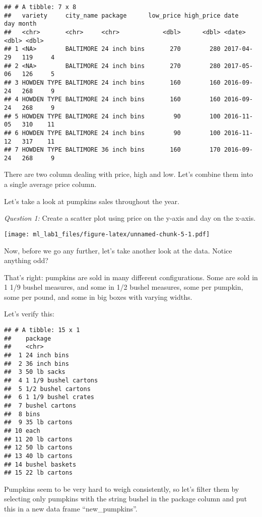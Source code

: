 \documentclass[
]{article}
\begin{document}
\begin{verbatim}
## # A tibble: 7 x 8
##   variety     city_name package      low_price high_price date         day month
##   <chr>       <chr>     <chr>            <dbl>      <dbl> <date>     <dbl> <dbl>
## 1 <NA>        BALTIMORE 24 inch bins       270        280 2017-04-29   119     4
## 2 <NA>        BALTIMORE 24 inch bins       270        280 2017-05-06   126     5
## 3 HOWDEN TYPE BALTIMORE 24 inch bins       160        160 2016-09-24   268     9
## 4 HOWDEN TYPE BALTIMORE 24 inch bins       160        160 2016-09-24   268     9
## 5 HOWDEN TYPE BALTIMORE 24 inch bins        90        100 2016-11-05   310    11
## 6 HOWDEN TYPE BALTIMORE 24 inch bins        90        100 2016-11-12   317    11
## 7 HOWDEN TYPE BALTIMORE 36 inch bins       160        170 2016-09-24   268     9
\end{verbatim}

There are two column dealing with price, high and low. Let's combine
them into a single average price column.

Let's take a look at pumpkins sales throughout the year.

\emph{Question 1:} Create a scatter plot using price on the y-axis and
day on the x-axis.

\texttt{[image: ml\_lab1\_files/figure-latex/unnamed-chunk-5-1.pdf]}

Now, before we go any further, let's take another look at the data.
Notice anything odd?

That's right: pumpkins are sold in many different configurations. Some
are sold in 1 1/9 bushel measures, and some in 1/2 bushel measures, some
per pumpkin, some per pound, and some in big boxes with varying widths.

Let's verify this:

\begin{verbatim}
## # A tibble: 15 x 1
##    package             
##    <chr>               
##  1 24 inch bins        
##  2 36 inch bins        
##  3 50 lb sacks         
##  4 1 1/9 bushel cartons
##  5 1/2 bushel cartons  
##  6 1 1/9 bushel crates 
##  7 bushel cartons      
##  8 bins                
##  9 35 lb cartons       
## 10 each                
## 11 20 lb cartons       
## 12 50 lb cartons       
## 13 40 lb cartons       
## 14 bushel baskets      
## 15 22 lb cartons
\end{verbatim}

Pumpkins seem to be very hard to weigh consistently, so let's filter
them by selecting only pumpkins with the string bushel in the package
column and put this in a new data frame ``new\_pumpkins''.
\end{document}
